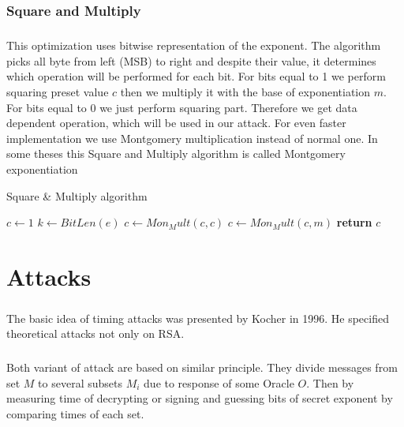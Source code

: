 \documentclass[thesis=B,english]{FITthesis}[2012/10/20]
\begin{document}
{\subsection{Square and Multiply}
\paragraph*{}
{This optimization uses bitwise representation of the exponent. The algorithm picks all byte from left (MSB) to right and despite their value, 
it determines which operation will be performed for each bit. For bits equal to 1 we perform squaring preset value \(c\) then we multiply it with the base of exponentiation \(m\). 
For bits equal to 0 we just perform squaring part. Therefore we get data dependent operation, which will be used in our attack. For even faster implementation we use Montgomery
multiplication instead of normal one. In some theses this Square and Multiply algorithm is called Montgomery exponentiation}



\begin{algorithm}[H]
\caption{Square \& Multiply algorithm}
\begin{algorithmic}[1]
 \State $c\gets 1$
 \State $k\gets BitLen(e)$
  \State $c \gets Mon_Mult(c,c)$
   \State $c \gets Mon_Mult(c,m)$
  \EndIf
 \EndFor
\State \textbf{return} $c$
\EndFunction
 
\end{algorithmic}
\end{algorithm}



\chapter{Attacks}
\paragraph*{}{
The basic idea of timing attacks was presented by Kocher in 1996. He specified theoretical attacks not only on RSA.
}

\paragraph*{}{
Both variant of attack are based on similar principle. They divide messages from set \(M\) to several subsets \(M_i\) due to response of some Oracle \(O\). Then by measuring time of decrypting or signing and 
guessing bits of secret exponent by comparing times of each set.
}
}
\end{document}
